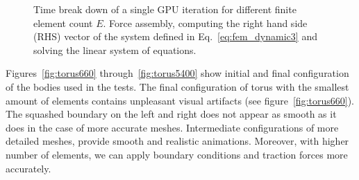 \documentclass[en]{minipw} %
\newcommand{\saveResultsFirst}[3]{
    \def\AccuracyFirst{#1}%
    \def\SensitivityFirst{#2}%
    \def\PrecisionFirst{#3}%
}
\newcommand{\saveResultsSecond}[3]{
    \def\AccuracySecond{#1}%
    \def\SensitivitySecond{#2}%
    \def\PrecisionSecond{#3}%
}
\newcommand{\saveResultsThird}[3]{
    \def\AccuracyThird{#1}%
    \def\SensitivityThird{#2}%
    \def\PrecisionThird{#3}%
}
\newcommand{\addBarPlotResults}[3]{
    \addplot[style={bblue, fill=bblue, mark=none}]
    coordinates 
    {
        (#1,  \AccuracyFirst)
        (#2,  \AccuracySecond)
        (#3,  \AccuracyThird)
    };
    
    \addplot[style={rred, fill=rred, mark=none}]
    coordinates 
    {
        (#1,  \SensitivityFirst)
        (#2,  \SensitivitySecond)
        (#3,  \SensitivityThird)
    };
    
    \addplot[style={ggreen, fill=ggreen, mark=none}]
    coordinates 
    {
        (#1,  \PrecisionFirst)
        (#2,  \PrecisionSecond)
        (#3,  \PrecisionThird)
    };
   
}
\begin{document}
    \begin{figure}[H]       
        
		\caption{Time break down of a single GPU iteration for different finite element count $E$. Force assembly, computing the right hand side (RHS) vector of the system defined in Eq.~\ref{eq:fem_dynamic3} and solving the linear system of equations.}
        \label{fig:gpu_breakdown}
    \end{figure}

Figures~\ref{fig:torus660} through~\ref{fig:torus5400} show initial and final configuration of the bodies used in the tests. The final configuration of torus with the smallest amount of elements contains unpleasant visual artifacts (see figure~\ref{fig:torus660}). The squashed boundary on the left and right does not appear as smooth as it does in the case of more accurate meshes. Intermediate configurations of more detailed meshes, provide smooth and realistic animations. Moreover, with higher number of elements, we can apply boundary conditions and traction forces more accurately.
\end{document}
